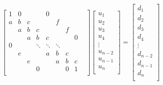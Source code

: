 \documentclass[12pt]{article}
\begin{document}
\[
\begin{bmatrix}
1 & 0 &   &   & 0 &   &    &\\
a & b & c &   &   & f &    &\\
  & a & b & c &   &   & f  &\\
  &   & a & b & c &   &    & 0\\
0 &   &   & \ddots & \ddots & \ddots &  &  \\
  & e &   &   & a & b & c &   &\\
  &   & e &   &   & a & b & c \\
  &   &   & 0 &   &   & 0 & 1 \\
\end{bmatrix}
\begin{bmatrix}
u_1 \\
u_2 \\
u_3 \\
u_4 \\
\vdots \\
u_{n-2} \\
u_{n-1} \\
u_n \\
\end{bmatrix}
=
\begin{bmatrix}
d_1 \\
d_2 \\
d_3 \\
d_4 \\
\vdots \\
d_{n-2} \\
d_{n-1} \\
d_n \\
\end{bmatrix}
\]
\end{document}
